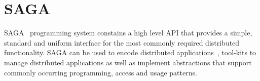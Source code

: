\documentclass[conference,final]{IEEEtran}
\begin{document}

\section{SAGA}


SAGA~\cite{saga-core} programming system constains a high level API
that provides a simple, standard and uniform interface for the most
commonly required distributed functionality.  SAGA can be used to
encode distributed applications~\cite{saga_escience07_short,
  saga_tg08}, tool-kits to manage distributed applications as well as
implement abstractions that support commonly occurring programming,
access and usage patterns.
\end{document}

